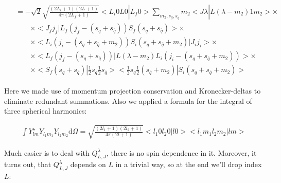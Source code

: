 \begin{align}
    \begin{split}
    &= -\sqrt{2}\sqrt{\frac{(2L_i + 1)(2L+1)}{4 \pi (2L_f + 1)}} <L_i 0 L 0 | L_f 0> \sum_{m_2, s_{q}, s_{\overline{q}}} m_2 <J \lambda| L (\lambda - m_2) 1 m_2> \times\\
        &\qquad\times <J_f j_f| L_f (j_f-(s_q + s_{\overline{q}})) S_f (s_q + s_{\overline{q}})> \times \\
        &\qquad\times <L_i (j_i - (s_q + s_{\overline{q}} + m_2)) S_i (s_q + s_{\overline{q}} + m_2)| J_i j_i> \times \\
        &\qquad\times <L_f (j_f - (s_q + s_{\overline{q}}))| L (\lambda - m_2) L_i (j_i - (s_q + s_{\overline{q}}+m_2))>  \times\\
        &\qquad\times <S_f (s_q + s_{\overline{q}})| \frac{1}{2} s_{q} \frac{1}{2} s_{\overline{q}}> <\frac{1}{2} s_{q} \frac{1}{2} (s_{\overline{q}} + m_2) |S_i (s_q + s_{\overline{q}} + m_2)>
    \end{split}
\end{align}

Here we made use of momentum projection conservation and Kronecker-deltas to eliminate redundant summations. Also we applied a formula for the integral of three spherical harmonics:

\begin{align}
    \int Y^{\star}_{l m} Y_{l_1 m_1} Y_{l_2 m_2} \mathrm{d} \Omega = \sqrt{\frac{(2l_1+1)(2l_2+1)}{4 \pi (2l+1)}} <l_1 0 l_2 0 | l 0> <l_1 m_1 l_2 m_2 | l m>
\end{align}

Much easier is to deal with $Q_{L, J}^\lambda$, there is no spin dependence in it. Moreover, it turns out, that $Q_{L, J}^{\lambda}$ depends on $L$ in a trivial way, so at the end we'll drop index $L$:

